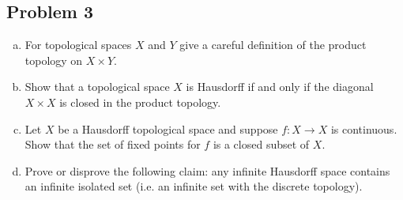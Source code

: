 \documentclass[12pt]{article}
\theoremstyle{definition}
\begin{document}
\subsection{Problem 3 \texorpdfstring{\cite{Munkres}}{}}
\begin{enumerate}[(a)]
    \item For topological spaces $X$ and $Y$ give a careful definition of the product topology on $X \times Y$.
    \item Show that a topological space $X$ is Hausdorff if and only if the diagonal $X \times X$ is closed in the product topology.
    \item Let $X$ be a Hausdorff topological space and suppose $f : X \to X$ is continuous. Show that the set of fixed points for $f$ is a closed subset of $X$.
    \item Prove or disprove the following claim: any infinite Hausdorff space contains an infinite isolated set (i.e. an infinite set with the discrete topology).
\end{enumerate}
\end{document}
